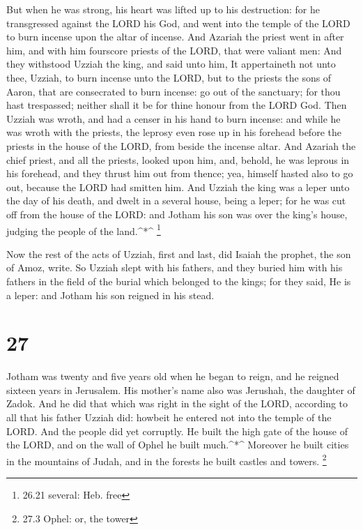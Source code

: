  But when he was strong, his heart was lifted up to his
destruction: for he transgressed against the LORD his God, and went into
the temple of the LORD to burn incense upon the altar of incense.
 And Azariah the priest went in after him, and with him
fourscore priests of the LORD, that were valiant men:  And
they withstood Uzziah the king, and said unto him, It appertaineth not
unto thee, Uzziah, to burn incense unto the LORD, but to the priests the
sons of Aaron, that are consecrated to burn incense: go out of the
sanctuary; for thou hast trespassed; neither shall it be for thine
honour from the LORD God.  Then Uzziah was wroth, and had a
censer in his hand to burn incense: and while he was wroth with the
priests, the leprosy even rose up in his forehead before the priests in
the house of the LORD, from beside the incense altar.  And
Azariah the chief priest, and all the priests, looked upon him, and,
behold, he was leprous in his forehead, and they thrust him out from
thence; yea, himself hasted also to go out, because the LORD had smitten
him.  And Uzziah the king was a leper unto the day of his
death, and dwelt in a several house, being a leper; for he was cut off
from the house of the LORD: and Jotham his son was over the king's
house, judging the people of the land.\^{}*\^{} \footnote{26.21 several:
  Heb. free}

 Now the rest of the acts of Uzziah, first and last, did
Isaiah the prophet, the son of Amoz, write.  So Uzziah
slept with his fathers, and they buried him with his fathers in the
field of the burial which belonged to the kings; for they said, He is a
leper: and Jotham his son reigned in his stead.

\hypertarget{section-26}{%
\section{27}\label{section-26}}

 Jotham was twenty and five years old when he began to
reign, and he reigned sixteen years in Jerusalem. His mother's name also
was Jerushah, the daughter of Zadok.  And he did that which
was right in the sight of the LORD, according to all that his father
Uzziah did: howbeit he entered not into the temple of the LORD. And the
people did yet corruptly.  He built the high gate of the
house of the LORD, and on the wall of Ophel he built much.\^{}*\^{}
 Moreover he built cities in the mountains of Judah, and in
the forests he built castles and towers. \footnote{27.3 Ophel: or, the
  tower}

